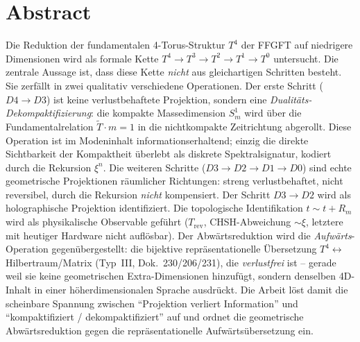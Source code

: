 

\section*{Abstract}
Die Reduktion der fundamentalen 4-Torus-Struktur $T^4$ der FFGFT auf niedrigere
Dimensionen wird als formale Kette $T^4 \to T^3 \to T^2 \to T^1 \to T^0$
untersucht. Die zentrale Aussage ist, dass diese Kette \emph{nicht} aus
gleichartigen Schritten besteht. Sie zerf\"allt in zwei qualitativ verschiedene
Operationen. Der erste Schritt ($D4\!\to\!D3$) ist keine verlustbehaftete
Projektion, sondern eine \emph{Dualit\"ats-Dekompaktifizierung}: die kompakte
Massedimension $S^1_m$ wird \"uber die Fundamentalrelation $\tilde{T}\cdot m = 1$
in die nichtkompakte Zeitrichtung abgerollt. Diese Operation ist im Modeninhalt
informationserhaltend; einzig die direkte Sichtbarkeit der Kompaktheit
\"uberlebt als diskrete Spektralsignatur, kodiert durch die Rekursion $\xi^n$.
Die weiteren Schritte ($D3\!\to\!D2\!\to\!D1\!\to\!D0$) sind echte geometrische
Projektionen r\"aumlicher Richtungen: streng verlustbehaftet, nicht reversibel,
durch die Rekursion \emph{nicht} kompensiert. Der Schritt $D3\!\to\!D2$ wird als
holographische Projektion identifiziert. Die topologische Identifikation
$t\sim t+R_m$ wird als physikalische Observable gef\"uhrt ($T_\text{rev}$,
CHSH-Abweichung $\sim\xi$, letztere mit heutiger Hardware nicht aufl\"osbar). Der Abw\"artsreduktion wird die \emph{Aufw\"arts}-
Operation gegen\"ubergestellt: die bijektive repr\"asentationelle \"Ubersetzung
$T^4 \leftrightarrow$ Hilbertraum/Matrix (Typ~III, Dok.~230/206/231), die
\emph{verlustfrei} ist -- gerade weil sie keine geometrischen Extra-Dimensionen
hinzuf\"ugt, sondern denselben 4D-Inhalt in einer h\"oherdimensionalen Sprache
ausdr\"uckt. Die Arbeit l\"ost damit die scheinbare Spannung zwischen
``Projektion verliert Information'' und ``kompaktifiziert / dekompaktifiziert''
auf und ordnet die geometrische Abw\"artsreduktion gegen die repr\"asentationelle
Aufw\"arts\"ubersetzung ein.




